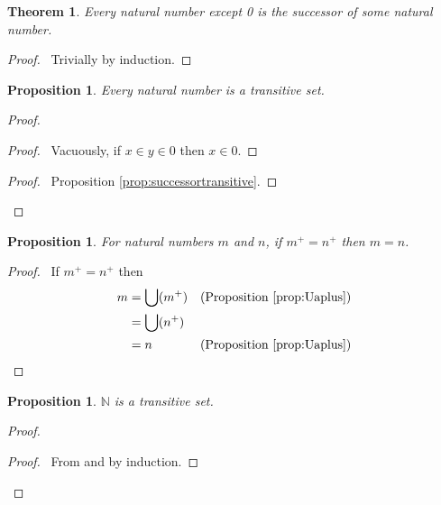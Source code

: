 \documentclass{book}
\let\qed\relax
\newtheorem{prop}[ax]{Proposition}
\newtheorem{thm}[ax]{Theorem}
\theoremstyle{definition}
\begin{document}
\begin{thm}
\label{thm:zeroorsucc}
Every natural number except 0 is the successor of some natural number.
\end{thm}

\begin{proof}
\pf\ Trivially by induction. \qed
\end{proof}

\begin{prop}
\label{prop:nattrans}
Every natural number is a transitive set.
\end{prop}

\begin{proof}
\pf
{}
\begin{proof}
	\pf\ Vacuously, if $x \in y \in 0$ then $x \in 0$.
\end{proof}
\begin{proof}
	\pf\ Proposition \ref{prop:successortransitive}.
\end{proof}
\qed
\end{proof}

\begin{prop}
\label{prop:Peano2}
For natural numbers $m$ and $n$, if $m^+ = n^+$ then $m = n$.
\end{prop}

\begin{proof}
	\pf\ If $m^+ = n^+$ then
	\begin{align*}
		m & = \bigcup (m^+) & (\text{Proposition \ref{prop:Uaplus}}) \\
		& = \bigcup (n^+) \\
		& = n & (\text{Proposition \ref{prop:Uaplus}})
	\end{align*}
\end{proof}
\begin{prop}
$\mathbb{N}$ is a transitive set.
\end{prop}

\begin{proof}
\pf
{}
\begin{proof}
	\pf\ From  and  by induction.
\end{proof}
\qed
\end{proof}
\end{document}

